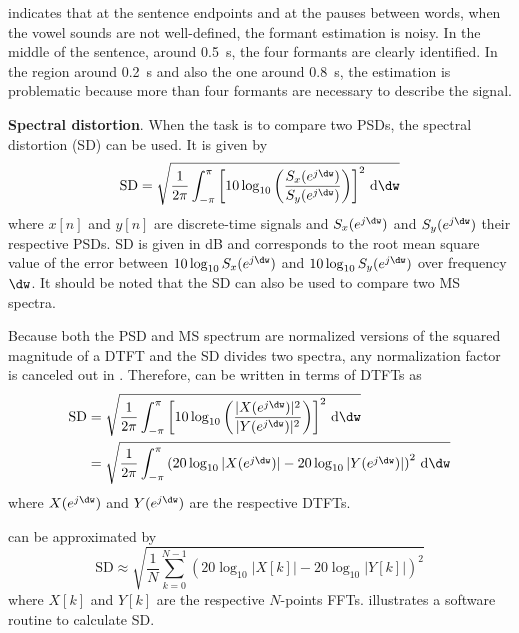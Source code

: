  indicates that at the sentence endpoints and at the pauses between words, when the vowel sounds are not well-defined, the formant estimation is noisy. In the middle of the sentence, around 0.5~s, the four formants are clearly identified. In the region around 0.2~s and also the one around 0.8~s, the estimation is  problematic because more than four formants are necessary to describe the signal.
\eApplication

\bApplication \textbf{Spectral distortion}.
\label{sec:spectral_distortion}
When the task is to compare two PSDs, the spectral distortion (SD) can be used. It is given by
\begin{equation}
\label{eq:sd1}
\textrm{SD} = \sqrt{\frac{1}{2\pi} \int_{-\pi}^{\pi}\left[ 10 \log_{10} \left( \frac{S_x(e^{j \dw})} {S_y(e^{j \dw})} \right) \right]^2 \, \textrm{d}\dw}
\end{equation}
where $x[n]$ and $y[n]$ are discrete-time signals and $S_x(e^{j \dw})$ and $S_y(e^{j \dw})$ their respective PSDs. SD is given in dB and corresponds to the root mean square
 value of the error between $10 \log_{10} S_x(e^{j \dw})$ and $10 \log_{10}  S_y(e^{j \dw})$ over frequency $\dw$. It should be noted that the SD can also be used to compare two MS spectra.

Because both the PSD and MS spectrum are normalized versions of the squared magnitude of a DTFT and the SD divides two spectra, any normalization factor is canceled out in . Therefore,  can be written in terms of DTFTs as
\begin{align}
\textrm{SD} &= \sqrt{\frac{1}{2\pi} \int_{-\pi}^{\pi}\left[10\log_{10} \left( \frac{|X(e^{j \dw})|^2}{|Y(e^{j \dw})|^2} \right) \right]^2 \, \textrm{d}\dw} \\
&= \sqrt{\frac{1}{2\pi} \int_{-\pi}^{\pi}\left(20\log_{10} |X(e^{j \dw})| - 20\log_{10}|Y(e^{j \dw})|\right)^2 \, \textrm{d}\dw}
\label{eq:sd2}
\end{align}
where $X(e^{j \dw})$ and $Y(e^{j \dw})$ are the respective DTFTs.
%

 can be approximated by
\begin{equation}
\label{eq:sd3}
\textrm{SD} \approx \sqrt{ \frac{1}{N}\sum_{k=0}^{N-1} \left(20\log_{10} |X[k]| - 20\log_{10}|Y[k]|\right)^2}
\end{equation}
where $X[k]$ and $Y[k]$ are the respective $N$-points FFTs.
 illustrates a software routine to calculate SD.

